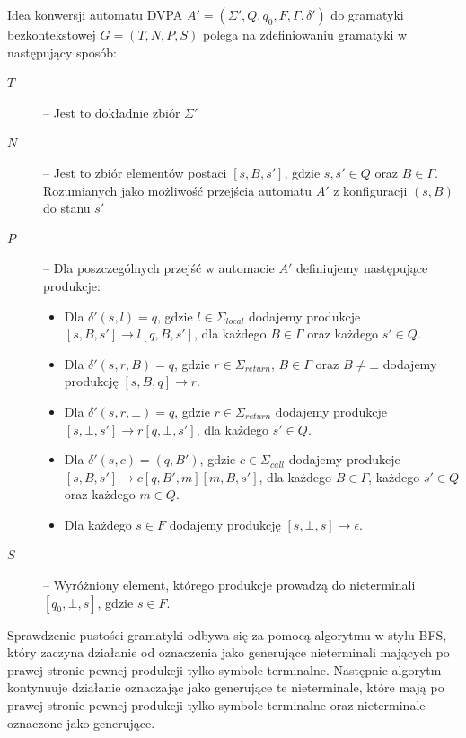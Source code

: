 Idea konwersji automatu DVPA $A' = (\Sigma', Q, q_0, F, \Gamma, \delta')$ do gramatyki bezkontekstowej $G = (T, N, P, S)$ polega na zdefiniowaniu
gramatyki w następujący sposób:
\begin{description}
    \item[$T$] -- Jest to dokładnie zbiór $\Sigma'$
    \item[$N$] -- Jest to zbiór elementów postaci $[s, B, s']$, gdzie $s, s' \in Q$ oraz $B \in \Gamma$. Rozumianych jako możliwość przejścia
                    automatu $A'$ z konfiguracji $(s, B)$ do stanu $s'$
    \item[$P$] -- Dla poszczególnych przejść w automacie $A'$ definiujemy następujące produkcje:
            \begin{itemize}
                \item Dla $\delta'(s, l) = q$, gdzie $l \in \Sigma_{local}$ dodajemy produkcje $[s, B, s'] \rightarrow l[q, B, s']$,
                        dla każdego $B \in \Gamma$ oraz każdego $s' \in Q$.
                \item Dla $\delta'(s, r, B) = q$, gdzie $r \in \Sigma_{return}$, $B \in \Gamma$ oraz $B \neq \bot$ dodajemy produkcję $[s, B, q] \rightarrow r$.
                \item Dla $\delta'(s, r, \bot) = q$, gdzie $r \in \Sigma_{return}$ dodajemy produkcje $[s, \bot, s'] \rightarrow r[q, \bot, s']$, dla każdego $s' \in Q$.
                \item Dla $\delta'(s, c) = (q, B')$, gdzie $c \in \Sigma_{call}$ dodajemy produkcje $[s, B, s'] \rightarrow c[q, B', m][m, B, s']$,
                        dla każdego $B \in \Gamma$, każdego $s' \in Q$ oraz każdego $m \in Q$.
                \item Dla każdego $s \in F$ dodajemy produkcję $[s, \bot, s] \rightarrow \epsilon$.
            \end{itemize}
    \item[$S$] -- Wyróżniony element, którego produkcje prowadzą do nieterminali $[q_0, \bot, s]$, gdzie $s \in F$.
\end{description}

Sprawdzenie pustości gramatyki odbywa się za pomocą algorytmu w stylu BFS, który zaczyna działanie od oznaczenia
jako generujące nieterminali mających po prawej stronie pewnej produkcji tylko symbole terminalne.
Następnie algorytm kontynuuje działanie oznaczając jako generujące te nieterminale,
które mają po prawej stronie pewnej produkcji tylko symbole terminalne oraz nieterminale oznaczone jako generujące.

